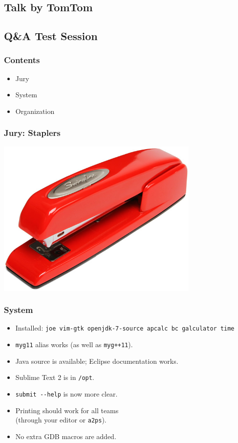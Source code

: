 \documentclass[t]{beamer}
\begin{document}
\subsection{Talk by TomTom}
\subsection{Q\&A Test Session}

\begin{frame}
	\frametitle{Contents}
		\begin{itemize}
		\item Jury
		\item System
		\item Organization
	\end{itemize}
\end{frame}


\begin{frame}
    \frametitle{Jury: Staplers}
	\includegraphics[width=100mm]{stapler.jpg}
\end{frame}

\begin{frame}[fragile]
    \frametitle{System}
    \begin{itemize}
        \item Installed: \lstinline|joe vim-gtk openjdk-7-source apcalc bc galculator time|
        \item \lstinline|myg11| alias works (as well as \lstinline|myg++11|).
        \item Java source is available; Eclipse documentation works.
        \item Sublime Text 2 is in \lstinline|/opt|.
        \item \lstinline|submit --help| is now more clear.
        \item Printing should work for all teams\\(through your editor or \lstinline|a2ps|).
        \item No extra GDB macros are added.
     \end{itemize}
\end{frame}
\end{document}
